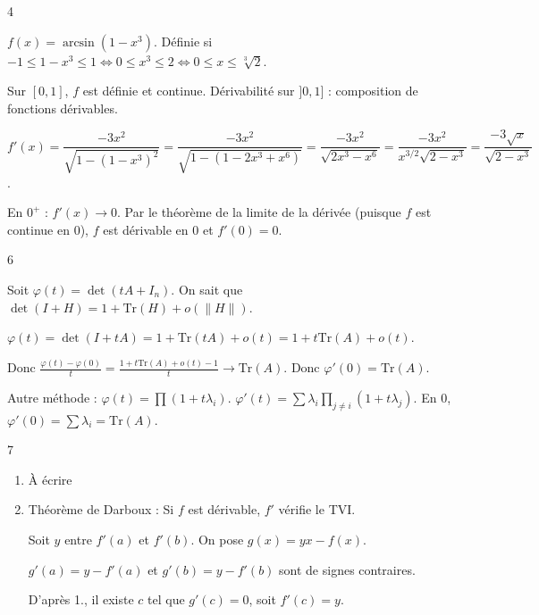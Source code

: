 \begin{correction}{4}

    $f(x) = \arcsin(1-x^3)$. Définie si $-1 \le 1-x^3 \le 1 \iff 0 \le x^3 \le 2 \iff 0 \le x \le \sqrt[3]{2}$.

    Sur $[0, 1]$, $f$ est définie et continue.
    Dérivabilité sur $]0, 1]$ : composition de fonctions dérivables.

    $$f'(x) = \frac{-3x^2}{\sqrt{1-(1-x^3)^2}} = \frac{-3x^2}{\sqrt{1-(1-2x^3+x^6)}} = \frac{-3x^2}{\sqrt{2x^3-x^6}} = \frac{-3x^2}{x^{3/2}\sqrt{2-x^3}} = \frac{-3\sqrt{x}}{\sqrt{2-x^3}}$$.

    En $0^+$ : $f'(x) \to 0$. Par le théorème de la limite de la dérivée (puisque $f$ est continue en 0), $f$ est dérivable en 0 et $f'(0)=0$.
\end{correction}

\begin{correction}{6}

    Soit $\varphi(t) = \det(tA+I_n)$.
    On sait que $\det(I+H) = 1 + \text{Tr}(H) + o(\|H\|)$.

    $\varphi(t) = \det(I+tA) = 1 + \text{Tr}(tA) + o(t) = 1 + t\text{Tr}(A) + o(t)$.

    Donc $\frac{\varphi(t)-\varphi(0)}{t} = \frac{1+t\text{Tr}(A)+o(t)-1}{t} \to \text{Tr}(A)$.
    Donc $\varphi'(0) = \text{Tr}(A)$.

    Autre méthode : $\varphi(t) = \prod (1+t\lambda_i)$. $\varphi'(t) = \sum \lambda_i \prod_{j \ne i} (1+t\lambda_j)$.
    En $0$, $\varphi'(0) = \sum \lambda_i = \text{Tr}(A)$.
\end{correction}

\begin{correction}{7}
\begin{enumerate}
    \item À écrire

    \item Théorème de Darboux : Si $f$ est dérivable, $f'$ vérifie le TVI.
    
        Soit $y$ entre $f'(a)$ et $f'(b)$. On pose $g(x) = yx - f(x)$.

        $g'(a) = y - f'(a)$ et $g'(b)= y - f'(b)$ sont de signes contraires.

        D'après 1., il existe $c$ tel que $g'(c)=0$, soit $f'(c)=y$.
\end{enumerate}
\end{correction}

